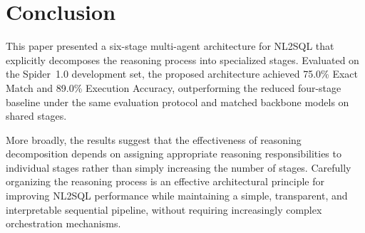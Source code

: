 \documentclass{svproc}
\begin{document}


\section{Conclusion}
\label{sec:conclusion}

This paper presented a six-stage multi-agent architecture for NL2SQL that explicitly decomposes the reasoning process into specialized stages. Evaluated on the Spider~1.0 development set, the proposed architecture achieved 75.0\% Exact Match and 89.0\% Execution Accuracy, outperforming the reduced four-stage baseline under the same evaluation protocol and matched backbone models on shared stages.


More broadly, the results suggest that the effectiveness of reasoning decomposition depends on assigning appropriate reasoning responsibilities to individual stages rather than simply increasing the number of stages. Carefully organizing the reasoning process is an effective architectural principle for improving NL2SQL performance while maintaining a simple, transparent, and interpretable sequential pipeline, without requiring increasingly complex orchestration mechanisms.
\end{document}
